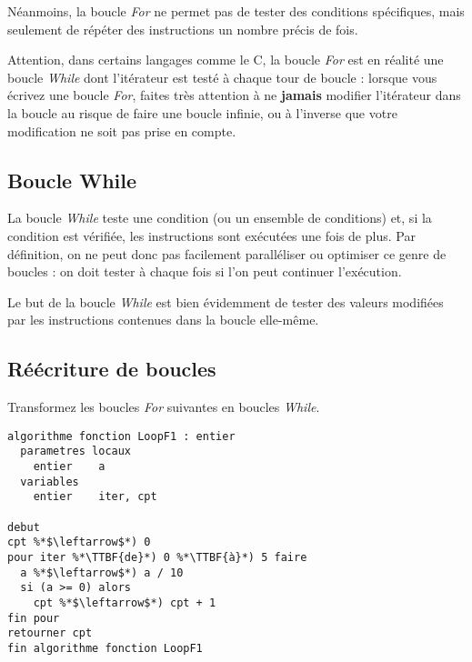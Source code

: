 \documentclass[11pt,a4paper]{article}
\begin{document}
\medskip

Néanmoins, la boucle \textit{For} ne permet pas de tester des conditions spécifiques, mais seulement de répéter des instructions un nombre précis de fois.

\medskip

Attention, dans certains langages comme le C, la boucle \textit{For} est en réalité une boucle \textit{While} dont l'itérateur est testé à chaque tour de boucle : lorsque vous écrivez une boucle \textit{For}, faites très attention à ne \textbf{jamais} modifier l'itérateur dans la boucle au risque de faire une boucle infinie, ou à l'inverse que votre modification ne soit pas prise en compte.

\bigskip

\subsection{Boucle While}

La boucle \textit{While} teste une condition (ou un ensemble de conditions) et, si la condition est vérifiée, les instructions sont exécutées une fois de plus.
Par définition, on ne peut donc pas facilement paralléliser ou optimiser ce genre de boucles : on doit tester à chaque fois si l'on peut continuer l'exécution.

\medskip

Le but de la boucle \textit{While} est bien évidemment de tester des valeurs modifiées par les instructions contenues dans la boucle elle-même.

\vfillFirst

\vfillLast

\clearpage


\subsection{Réécriture de boucles}

Transformez les boucles \textit{For} suivantes en boucles \textit{While}.


\begin{table}[ht!]
  \centering
  \begin{minipage}{0.5\textwidth}
    \centering
\begin{lstlisting}[style=algorithmique]
algorithme fonction LoopF1 : entier
  parametres locaux
    entier    a
  variables
    entier    iter, cpt

debut
cpt %*$\leftarrow$*) 0
pour iter %*\TTBF{de}*) 0 %*\TTBF{à}*) 5 faire
  a %*$\leftarrow$*) a / 10
  si (a >= 0) alors
    cpt %*$\leftarrow$*) cpt + 1
fin pour
retourner cpt
fin algorithme fonction LoopF1 \end{lstlisting}

  \end{minipage}
  \hfillx
  \begin{minipage}{0.5\textwidth}

  \end{minipage}
\end{table}
\end{document}
